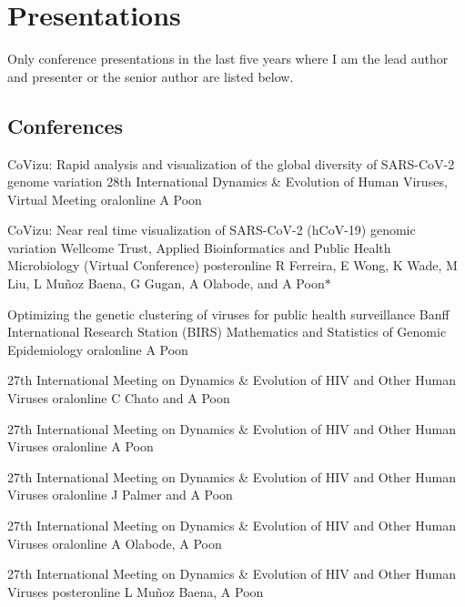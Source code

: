 \section {Presentations}

Only conference presentations in the last five years where I am the lead author and presenter or the senior author are listed below.

\subsection {Conferences}

{CoVizu: Rapid analysis and visualization of the global diversity of SARS-CoV-2 genome variation}
{28th International Dynamics \& Evolution of Human Viruses, Virtual Meeting}
{oral}{online}
{A Poon}{}

{CoVizu: Near real time visualization of SARS-CoV-2 (hCoV-19) genomic variation}
{Wellcome Trust, Applied Bioinformatics and Public Health Microbiology (Virtual Conference)}
{poster}{online}
{R Ferreira, E Wong, K Wade, M Liu, L Mu\~noz Baena, G Gugan, A Olabode, and A Poon$\ast$}{}

{Optimizing the genetic clustering of viruses for public health surveillance}
{Banff International Research Station (BIRS) Mathematics and Statistics of Genomic Epidemiology}
{oral}{online}
{A Poon}{}

{27th International Meeting on Dynamics \& Evolution of HIV and Other Human Viruses}
{oral}{online}
{C Chato and A Poon}{}

{27th International Meeting on Dynamics \& Evolution of HIV and Other Human Viruses}
{oral}{online}
{A Poon}{}

{27th International Meeting on Dynamics \& Evolution of HIV and Other Human Viruses}
{oral}{online}
{J Palmer and A Poon}{}

{27th International Meeting on Dynamics \& Evolution of HIV and Other Human Viruses}
{oral}{online}
{A Olabode, A Poon}{}

{27th International Meeting on Dynamics \& Evolution of HIV and Other Human Viruses}
{poster}{online}
{L Mu\~noz Baena, A Poon}{}

